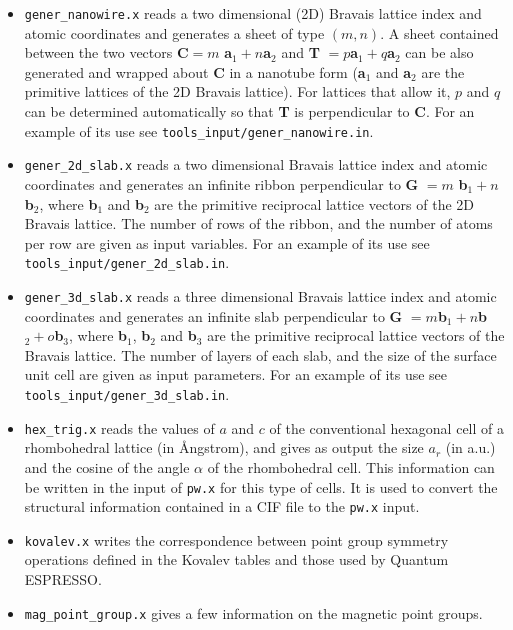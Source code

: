 \documentclass[12pt,a4paper,twoside]{report}
\def\qe{{\sc Quantum ESPRESSO}}
\begin{document}
\begin{itemize}
\item \texttt{gener\_nanowire.x} reads a two dimensional (2D)
Bravais lattice index and atomic coordinates and generates a sheet of type
$(m,n)$. A sheet contained between the two vectors 
{\bf C}$ = m$ {\bf a}$_1 + n ${\bf a}$_2$ and {\bf T} $= p ${\bf a}$_1 + q ${\bf a}$_2$
can be also generated and wrapped about {\bf C} in a nanotube form 
({\bf a}$_1$ and {\bf a}$_2$ are the primitive lattices of the 2D Bravais 
lattice). 
For lattices that allow it, $p$ and $q$ can be determined automatically so that 
{\bf T} is perpendicular to {\bf C}.
For an example of its use see \texttt{tools\_input/gener\_nanowire.in}.

\item \texttt{gener\_2d\_slab.x} reads a two dimensional 
Bravais lattice index and atomic coordinates and generates an infinite ribbon
perpendicular to {\bf G} $= m$ {\bf b}$_1 + n ${\bf b}$_2$, where 
{\bf b}$_1$ and {\bf b}$_2$ are the primitive reciprocal lattice vectors 
of the 2D Bravais lattice. The number of rows of the ribbon, and the number of
atoms per row are given as input variables.
For an example of its use see \texttt{tools\_input/gener\_2d\_slab.in}.

\item \texttt{gener\_3d\_slab.x} reads a three dimensional
Bravais lattice index and atomic coordinates and generates an infinite slab
perpendicular to {\bf G} $= m ${\bf b}$_1 + n ${\bf b}$_2 + o ${\bf b}$_3$, 
where {\bf b}$_1$, {\bf b}$_2$ and {\bf b}$_3$ are the primitive reciprocal 
lattice
vectors of the Bravais lattice. The number of layers of each slab, and the
size of the surface unit cell are given as input parameters.
For an example of its use see \texttt{tools\_input/gener\_3d\_slab.in}.

\item \texttt{hex\_trig.x} reads the values of $a$ and $c$
of the conventional hexagonal cell of a rhombohedral lattice (in \AA ngstrom),
and gives as output the size $a_r$ (in a.u.) and the cosine of the angle
$\alpha$ of the rhombohedral cell. This information can
be written in the input of \texttt{pw.x} for this type of cells. It
is used to convert the structural information contained in a CIF file
to the \texttt{pw.x} input.

\item \texttt{kovalev.x} writes the correspondence between point group
symmetry operations defined in the Kovalev tables and those used by \qe.

\item \texttt{mag\_point\_group.x} gives a few information on the magnetic point
groups.


\end{itemize}
\end{document}
